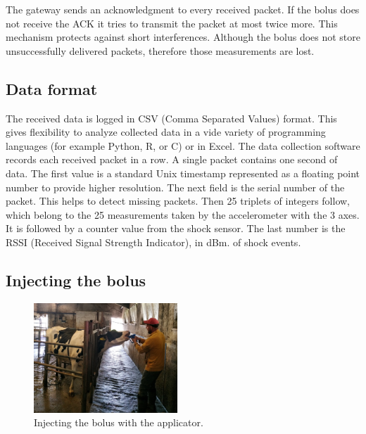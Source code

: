 \documentclass[conference]{IEEEtran}
\begin{document}
The gateway sends an acknowledgment to every received packet. If the bolus
does not receive the ACK it tries to transmit the packet at most twice more.
This mechanism protects against short interferences. Although the bolus does
not store unsuccessfully delivered packets, therefore those measurements are
lost.

\subsection{Data format}

The received data is logged in CSV (Comma Separated Values) format. This gives
flexibility to analyze collected data in a vide variety of programming languages
(for example Python, R, or C) or in Excel. The data collection software records
each received packet in a row. A single packet contains one second of data.
The first
value is a standard Unix timestamp represented as a floating point number to provide
higher resolution. The next field is the serial number of the packet. This helps to
detect missing packets. Then 25 triplets of integers follow, which belong to the
25 measurements taken by the accelerometer with the 3 axes. It is followed by
a counter value from the shock sensor. The last number is the RSSI (Received
Signal Strength Indicator), in dBm.
of shock events.



\subsection{Injecting the bolus}

\begin{figure}[htbp]
  \centerline{\includegraphics[width=0.48\textwidth]{fig/bolus_application.jpg}}
  \caption{Injecting the bolus with the applicator.}
  \label{bolus-injecting}
\end{figure}
\end{document}
